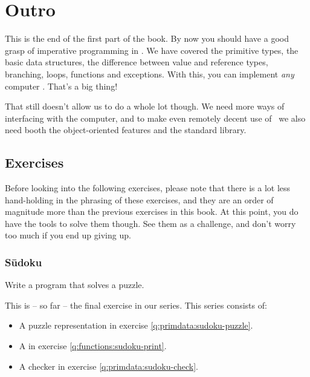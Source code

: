 \chapter{Outro}

This is the end of the first part of the book. By now you should have a good grasp of imperative programming in \csharp. We have covered the primitive types, the basic data structures, the difference between value and reference types, branching, loops, functions and exceptions. With this, you can implement \textsl{any} computer . That's a big thing!

That still doesn't allow us to do a whole lot though. We need more ways of interfacing with the computer, and to make even remotely decent use of \csharp\ we also need booth the object-oriented features and the standard library.


\section{Exercises}

Before looking into the following exercises, please note that there is a lot less hand-holding in the phrasing of these exercises, and they are an order of magnitude more  than the previous exercises in this book. At this point, you do have the tools to solve them though. See them as a challenge, and don't worry too much if you end up giving up.

\subsection{Sūdoku}

Write a program that solves a puzzle.

This is -- so far -- the final exercise in our  series. This series consists of:
\begin{itemize}
  \item A puzzle representation in exercise \ref{q:primdata:sudoku-puzzle}.
  \item A  in exercise \ref{q:functions:sudoku-print}.
  \item A checker in exercise \ref{q:primdata:sudoku-check}.
\end{itemize}

